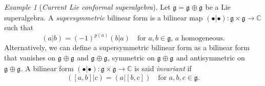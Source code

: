 \documentclass[a4paper, 12pt, reqno]{amsart}
\theoremstyle{remark}
\newtheorem{example}[theorem]{Example}
\DeclareMathOperator{\zero}{\overline{0}}
\DeclareMathOperator{\one}{\overline{1}}
\begin{document}
\begin{example}[\emph{Current Lie conformal superalgebra}]
  \label{exa:2}
  Let $\mathfrak{g} = \mathfrak{g}_{\zero} \oplus \mathfrak{g}_{\one}$ be a Lie superalgebra.
  A \emph{supersymmetric} bilinear form is a bilinear map $(\bullet| \bullet): \mathfrak{g} \times \mathfrak{g} \to \mathbb{C}$ such that
  \begin{equation*}
    (a| b) = (-1)^{p(a)}(b| a) \quad \text{for $a, b \in \mathfrak{g}$, $a$ homogeneous}.
  \end{equation*}
  Alternatively, we can define a supersymmetric bilinear form as a bilinear form that vanishes on $\mathfrak{g}_{\zero} \oplus \mathfrak{g}_{\one}$ and $\mathfrak{g}_{\one} \oplus \mathfrak{g}_{\zero}$, symmetric on $\mathfrak{g}_{\zero} \oplus \mathfrak{g}_{\zero}$ and antisymmetric on $\mathfrak{g}_{\one} \oplus \mathfrak{g}_{\one}$.
  A bilinear form $(\bullet| \bullet): \mathfrak{g} \times \mathfrak{g} \to \mathbb{C}$ is said \emph{invariant} if
  \begin{equation*}
    ([a, b]| c) = (a| [b, c]) \quad \text{for $a, b, c \in \mathfrak{g}$}.
  \end{equation*}


\end{example}
\end{document}

